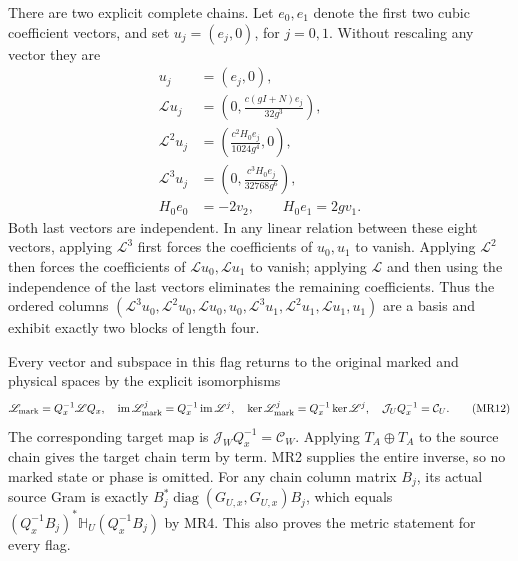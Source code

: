 There are two explicit complete chains. Let $e_0,e_1$
denote the first two cubic coefficient vectors, and set
$u_j=(e_j,0)$, for $j=0,1$. Without rescaling any vector they are
\begin{equation}
 \begin{split}
 u_j&=(e_j,0),\\
 \mathscr L u_j&=\left(0,\frac{c(gI+N)e_j}{32g^3}\right),\\
 \mathscr L^2u_j&=\left(\frac{c^2H_0e_j}{1024g^4},0\right),\\
 \mathscr L^3u_j&=\left(0,\frac{c^3H_0e_j}{32768g^6}\right),\\
 H_0e_0&=-2v_2,\qquad H_0e_1=2gv_1.
 \end{split}\tag{MR11}
\end{equation}
Both last vectors are independent. In any linear relation
between these eight vectors, applying $\mathscr L^3$ first
forces the coefficients of $u_0,u_1$ to vanish. Applying
$\mathscr L^2$ then forces the coefficients of
$\mathscr L u_0,\mathscr L u_1$ to vanish; applying
$\mathscr L$ and then using the independence of the last
vectors eliminates the remaining coefficients. Thus the
ordered columns
$(\mathscr L^3u_0,\mathscr L^2u_0,\mathscr L u_0,u_0,
  \mathscr L^3u_1,\mathscr L^2u_1,\mathscr L u_1,u_1)$
are a basis and exhibit exactly two blocks of length four.

Every vector and subspace in this flag returns to the original
marked and physical spaces by the explicit isomorphisms
\begin{equation}
 \mathscr L_{\rm mark}=Q_x^{-1}\mathscr LQ_x,
 \quad \operatorname{im}\mathscr L_{\rm mark}^j
       =Q_x^{-1}\operatorname{im}\mathscr L^j,
 \quad \ker\mathscr L_{\rm mark}^j
       =Q_x^{-1}\ker\mathscr L^j,
 \quad \mathcal J_UQ_x^{-1}=\mathcal C_U.
 \tag{MR12}
\end{equation}
The corresponding target map is $\mathcal J_WQ_x^{-1}
=\mathcal C_W$. Applying $T_A\oplus T_A$ to the source
chain gives the target chain term by term. MR2 supplies the
entire inverse, so no marked state or phase is omitted.
For any chain column matrix $B_j$, its actual source Gram
is exactly $B_j^*\operatorname{diag}(G_{U,x},G_{U,x})B_j$,
which equals $(Q_x^{-1}B_j)^*\mathbb H_U(Q_x^{-1}B_j)$
by MR4. This also proves the metric statement for every flag.


